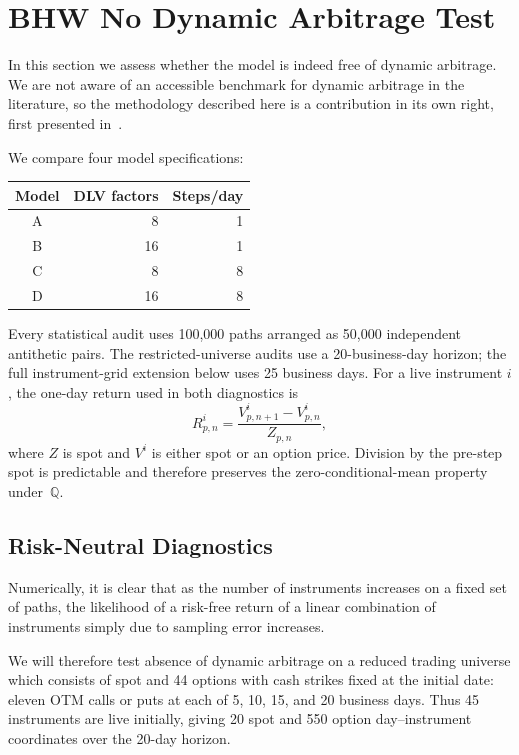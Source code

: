 \documentclass[11pt]{article}
\newcommand{\Q}{\mathbb Q}
\theoremstyle{plain}
\theoremstyle{definition}
\theoremstyle{remark}
\begin{document}
\section{BHW No Dynamic Arbitrage Test}\label{sec:numerics}

In this section we assess whether the model is indeed free of dynamic arbitrage.
We are not aware of an accessible benchmark for dynamic arbitrage in the literature, so
the methodology described here is a contribution in its own right, first presented in~\cite{DYSANOS2026}.

We compare four model specifications:
\begin{center}
\begin{tabular}{crr}
\toprule
Model & DLV factors & Steps/day\\
\midrule
A & 8  & 1\\
B & 16 & 1\\
C & 8  & 8\\
D & 16 & 8\\
\bottomrule
\end{tabular}
\end{center}
Every statistical audit uses 100,000 paths arranged as 50,000 independent antithetic
pairs.  The restricted-universe audits use a 20-business-day horizon; the full
instrument-grid extension below uses 25 business days.  For a live instrument $i$, the
one-day return used in both diagnostics is
\begin{equation}\label{eq:numerics-spot-scaled-return}
  R_{p,n}^i
  =\frac{V_{p,n+1}^i-V_{p,n}^i}{Z_{p,n}},
\end{equation}
where $Z$ is spot and $V^i$ is either spot or an option price.  Division by the
pre-step spot is predictable and therefore preserves the zero-conditional-mean
property under~$\Q$.

\subsection{Risk-Neutral Diagnostics}
\label{sec:numerics-audit-definition}

Numerically, it is clear that as the number
of instruments increases on a fixed set of paths, the likelihood of a risk-free return
of a linear combination of instruments simply due to sampling error increases.

We will therefore test absence of dynamic arbitrage on a reduced trading universe which consists of spot and
44 options with cash strikes fixed at the initial date: eleven OTM calls or
puts at each of 5, 10, 15, and 20 business days.  Thus 45 instruments are live
initially, giving 20 spot and 550 option day--instrument coordinates over the
20-day horizon. 
\end{document}
